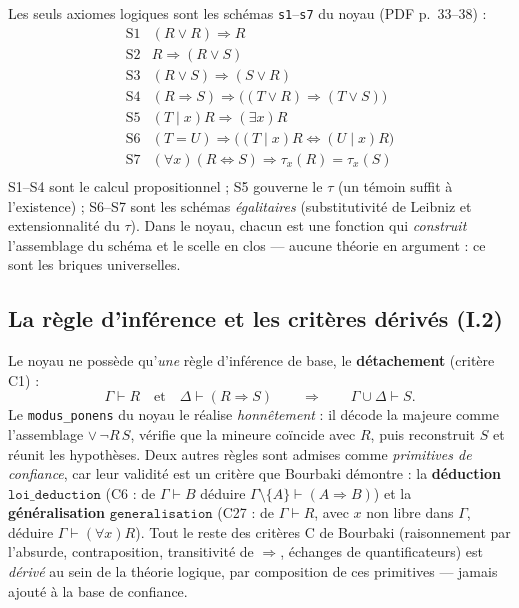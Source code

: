 Les seuls axiomes logiques sont les schémas \texttt{s1}--\texttt{s7} du noyau
(PDF p.~33--38) :
\[
\begin{array}{ll}
  \text{S1} & (R\vee R)\Rightarrow R \\
  \text{S2} & R\Rightarrow(R\vee S) \\
  \text{S3} & (R\vee S)\Rightarrow(S\vee R) \\
  \text{S4} & (R\Rightarrow S)\Rightarrow\bigl((T\vee R)\Rightarrow(T\vee S)\bigr) \\
  \text{S5} & (T\mid x)R \Rightarrow (\exists x)R \\
  \text{S6} & (T=U)\Rightarrow\bigl((T\mid x)R \Leftrightarrow (U\mid x)R\bigr) \\
  \text{S7} & (\forall x)(R\Leftrightarrow S)\Rightarrow \tau_x(R)=\tau_x(S) \\
\end{array}
\]
S1--S4 sont le calcul propositionnel ; S5 gouverne le $\tau$ (un témoin suffit
à l'existence) ; S6--S7 sont les schémas \emph{égalitaires} (substitutivité de
Leibniz et extensionnalité du $\tau$). Dans le noyau, chacun est une fonction
qui \emph{construit} l'assemblage du schéma et le scelle en \theoreme{} clos ---
aucune théorie en argument : ce sont les briques universelles.

\subsection{La règle d'inférence et les critères dérivés (I.2)}

Le noyau ne possède qu'\emph{une} règle d'inférence de base, le
\textbf{détachement} (critère C1) :
\[
  \Gamma\vdash R \quad\text{et}\quad \Delta\vdash(R\Rightarrow S)
  \qquad\Longrightarrow\qquad \Gamma\cup\Delta\vdash S.
\]
Le \texttt{modus\_ponens} du noyau le réalise \emph{honnêtement} : il décode la
majeure comme l'assemblage $\vee\,\neg R\,S$, vérifie que la mineure coïncide
avec $R$, puis reconstruit $S$ et réunit les hypothèses. Deux autres règles sont
admises comme \emph{primitives de confiance}, car leur validité est un critère
que Bourbaki démontre : la \textbf{déduction} $\texttt{loi\_deduction}$ (C6 :
de $\Gamma\vdash B$ déduire $\Gamma\setminus\{A\}\vdash(A\Rightarrow B)$) et la
\textbf{généralisation} $\texttt{generalisation}$ (C27 : de $\Gamma\vdash R$,
avec $x$ non libre dans $\Gamma$, déduire $\Gamma\vdash(\forall x)R$). Tout le
reste des critères C de Bourbaki (raisonnement par l'absurde, contraposition,
transitivité de $\Rightarrow$, échanges de quantificateurs) est \emph{dérivé} au
sein de la théorie logique, par composition de ces primitives --- jamais ajouté
à la base de confiance.

